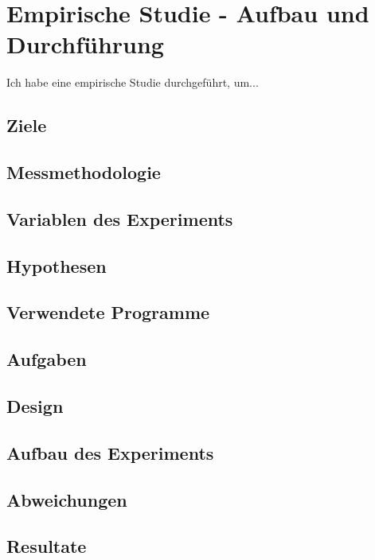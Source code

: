 \chapter{Empirische Studie - Aufbau und Durchführung}
Ich habe eine empirische Studie durchgeführt, um...
\section{Ziele}
\section{Messmethodologie}
\section{Variablen des Experiments}
\section{Hypothesen}
\section{Verwendete Programme}
\section{Aufgaben}
\section{Design}
\section{Aufbau des Experiments}
\section{Abweichungen}

\section{Resultate}

